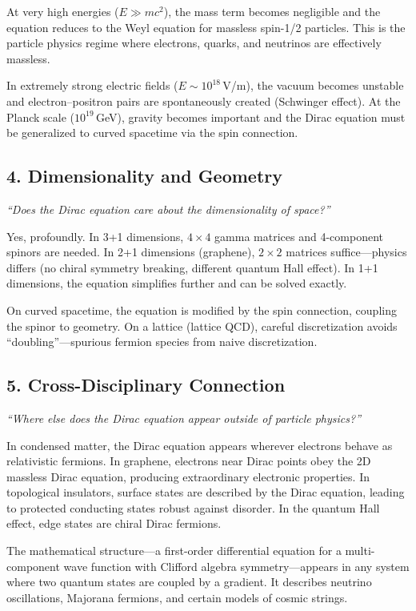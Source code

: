 At very high energies ($E \gg mc^2$), the mass term becomes negligible and the equation reduces to the Weyl equation for massless spin-1/2 particles. This is the particle physics regime where electrons, quarks, and neutrinos are effectively massless.

In extremely strong electric fields ($E \sim 10^{18}$\,V/m), the vacuum becomes unstable and electron--positron pairs are spontaneously created (Schwinger effect). At the Planck scale ($10^{19}$\,GeV), gravity becomes important and the Dirac equation must be generalized to curved spacetime via the spin connection.

\subsection*{4. Dimensionality and Geometry}
\textit{``Does the Dirac equation care about the dimensionality of space?''}

Yes, profoundly. In 3+1 dimensions, $4\times 4$ gamma matrices and 4-component spinors are needed. In 2+1 dimensions (graphene), $2\times 2$ matrices suffice---physics differs (no chiral symmetry breaking, different quantum Hall effect). In 1+1 dimensions, the equation simplifies further and can be solved exactly.

On curved spacetime, the equation is modified by the spin connection, coupling the spinor to geometry. On a lattice (lattice QCD), careful discretization avoids ``doubling''---spurious fermion species from naive discretization.

\subsection*{5. Cross-Disciplinary Connection}
\textit{``Where else does the Dirac equation appear outside of particle physics?''}

In condensed matter, the Dirac equation appears wherever electrons behave as relativistic fermions. In graphene, electrons near Dirac points obey the 2D massless Dirac equation, producing extraordinary electronic properties. In topological insulators, surface states are described by the Dirac equation, leading to protected conducting states robust against disorder. In the quantum Hall effect, edge states are chiral Dirac fermions.

The mathematical structure---a first-order differential equation for a multi-component wave function with Clifford algebra symmetry---appears in any system where two quantum states are coupled by a gradient. It describes neutrino oscillations, Majorana fermions, and certain models of cosmic strings.


